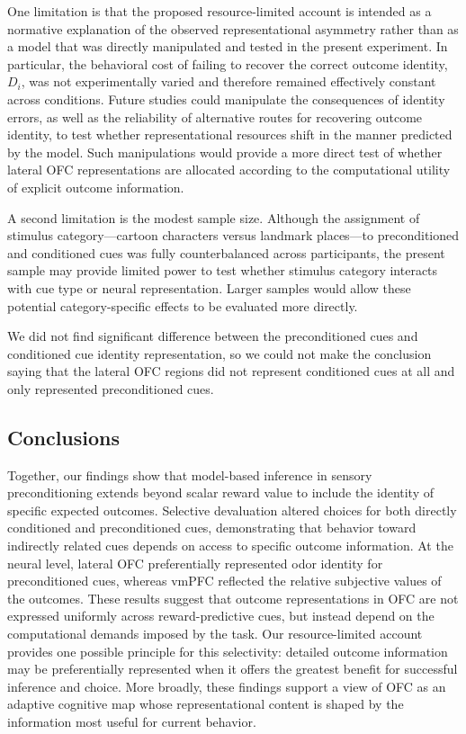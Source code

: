 \documentclass[12pt,letterpaper]{article}
\begin{document}
One limitation is that the proposed resource-limited account is intended as a normative explanation of the observed representational asymmetry rather than as a model that was directly manipulated and tested in the present experiment. In particular, the behavioral cost of failing to recover the correct outcome identity, \(D_i\), was not experimentally varied and therefore remained effectively constant across conditions. Future studies could manipulate the consequences of identity errors, as well as the reliability of alternative routes for recovering outcome identity, to test whether representational resources shift in the manner predicted by the model. Such manipulations would provide a more direct test of whether lateral OFC representations are allocated according to the computational utility of explicit outcome information.


A second limitation is the modest sample size. Although the assignment of stimulus category—cartoon characters versus landmark places—to preconditioned and conditioned cues was fully counterbalanced across participants, the present sample may provide limited power to test whether stimulus category interacts with cue type or neural representation. Larger samples would allow these potential category-specific effects to be evaluated more directly. 

We did not find significant difference between the preconditioned cues and conditioned cue identity representation, so we could not make the conclusion saying that the lateral OFC regions did not represent conditioned cues at all and only represented preconditioned cues. 


\subsection*{Conclusions}

Together, our findings show that model-based inference in sensory preconditioning extends beyond scalar reward value to include the identity of specific expected outcomes. Selective devaluation altered choices for both directly conditioned and preconditioned cues, demonstrating that behavior toward indirectly related cues depends on access to specific outcome information. At the neural level, lateral OFC preferentially represented odor identity for preconditioned cues, whereas vmPFC reflected the relative subjective values of the outcomes. These results suggest that outcome representations in OFC are not expressed uniformly across reward-predictive cues, but instead depend on the computational demands imposed by the task. Our resource-limited account provides one possible principle for this selectivity: detailed outcome information may be preferentially represented when it offers the greatest benefit for successful inference and choice. More broadly, these findings support a view of OFC as an adaptive cognitive map whose representational content is shaped by the information most useful for current behavior.
\end{document}

